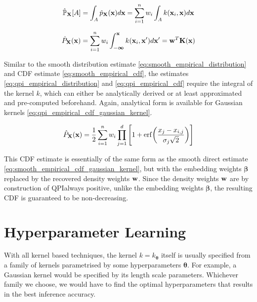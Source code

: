 \documentclass[twoside]{article} \usepackage{aistats2017}
\theoremstyle{definition}
\theoremstyle{theorem}
\newcommand{\rv}[1]{{#1}}
\newcommand{\qpi}{QPI}
\begin{document}
	\begin{equation}
		\hat{\mathbb{P}}_{\bvec{\rv{X}}}[A] = \int_{A} \hat{p}_{\bvec{\rv{X}}}(\bvec{x}) d\bvec{x} = \sum_{i = 1}^{n} w_{i} \int_{A} k(\bvec{x}_{i}, \bvec{x}) d\bvec{x}
	\label{eq:qpi_empirical_distribution}
	\end{equation}
	
	\begin{equation}
		\hat{P}_{\bvec{\rv{X}}}(\bvec{x}) = \sum_{i = 1}^{n} w_{i} \int_{-\bm{\infty}}^{\bvec{x}} k(\bvec{x}_{i}, \bvec{x}') d\bvec{x}' =  \bvec{w}^{T} \bvec{K}(\bvec{x})
	\label{eq:qpi_empirical_cdf}
	\end{equation}
	
	Similar to the smooth distribution estimate \eqref{eq:smooth_empirical_distribution} and CDF estimate \eqref{eq:smooth_empirical_cdf}, the estimates \eqref{eq:qpi_empirical_distribution} and \eqref{eq:qpi_empirical_cdf} require the integral of the kernel $k$, which can either be analytically derived or at least approximated and pre-computed beforehand. Again, analytical form is available for Gaussian kernels \eqref{eq:qpi_empirical_cdf_gaussian_kernel}.
	
	\begin{equation}
		\hat{P}_{\bvec{\rv{X}}}(\bvec{x}) = \frac{1}{2} \sum_{i = 1}^{n} w_{i} \prod_{j = 1}^{d} \Bigg[1 + \mathrm{erf}\bigg(\frac{x_{j} - x_{i, j}}{\sigma_{j} \sqrt{2}}\bigg)\Bigg]
	\label{eq:qpi_empirical_cdf_gaussian_kernel}
	\end{equation}
	
	This CDF estimate is essentially of the same form as the smooth direct estimate \eqref{eq:smooth_empirical_cdf_gaussian_kernel}, but with the embedding weights $\bm{\beta}$ replaced by the recovered density weights $\mathbf{w}$. Since the density weights $\mathbf{w}$ are by construction of \qpi\space always positive, unlike the embedding weights $\bm{\beta}$, the resulting CDF is guaranteed to be non-decreasing.
 
\section{Hyperparameter Learning}
\label{sec:hyperparameter_learning}

	With all kernel based techniques, the kernel $k = k_{\bm{\theta}}$ itself is usually specified from a family of kernels parametrised by some hyperparameters $\bm{\theta}$. For example, a Gaussian kernel would be specified by its length scale parameters. Whichever family we choose, we would have to find the optimal hyperparameters that results in the best inference accuracy. %
	
\end{document}
